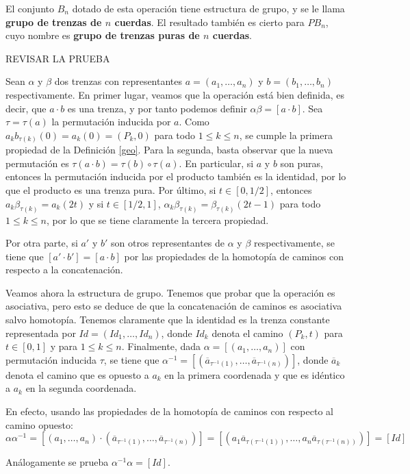 \documentclass[bibtex, anon]{TEMat-article}
\begin{document}
\begin{proposicion}
	El conjunto $B_n$ dotado de esta operación tiene estructura de grupo, y se le llama \textbf{grupo de trenzas de $n$ cuerdas}. El resultado también es cierto para $PB_n$, cuyo nombre es \textbf{grupo de trenzas puras de $n$ cuerdas}. 
\end{proposicion}
REVISAR LA PRUEBA
\begin{demostracion}
	Sean $\alpha$ y $\beta$ dos trenzas con representantes $a=(a_1,\dots, a_n)$ y $b=(b_1,\dots, b_n)$ respectivamente. En primer lugar, veamos que la operación está bien definida, es decir, que $a\cdot b$ es una trenza, y por tanto podemos definir $\alpha\beta=[a\cdot b]$. Sea $\tau=\tau(a)$ la permutación inducida por $a$. Como $a_kb_{\tau(k)}(0)=a_k(0)=(P_k,0)$ para todo $1\leq k\leq n$, se cumple la primera propiedad de la Definición \ref{geo}. Para la segunda, basta observar que la nueva permutación es $\tau(a\cdot b)=\tau(b)\circ \tau(a)$. En particular, si $a$ y $b$ son puras, entonces la permutación inducida por el producto también es la identidad, por lo que el producto es una trenza pura. Por último, si $t\in[0,1/2]$, entonces $a_k\beta_{\tau(k)}=a_k(2t)$ y si $t\in [1/2,1]$, $\alpha_k\beta_{\tau(k)}=\beta_{\tau(k)}(2t-1)$ para todo $1\leq k\leq n$, por lo que se tiene claramente la tercera propiedad. 
	
	Por otra parte, si $a'$ y $b'$ son otros representantes de $\alpha$ y $\beta$ respectivamente, se tiene que $[a'\cdot b']=[a\cdot b]$ por las propiedades de la homotopía de caminos con respecto a la concatenación.
	
	Veamos ahora la estructura de grupo. Tenemos que probar que la operación es asociativa, pero esto se deduce de que la concatenación de caminos es asociativa salvo homotopía.
	Tenemos claramente que la identidad es la trenza constante representada por $Id=(Id_1,\dots, Id_n)$, donde $Id_k$ denota el camino $(P_k, t)$ para $t\in[0,1]$ y para $1\leq k\leq n$.
	Finalmente, dada $\alpha=[(a_1,\dots, a_n)]$ con permutación inducida $\tau$, se tiene que $\alpha^{-1}=[(\overline{a}_{\tau^{-1}(1)},\dots, \overline{a}_{\tau^{-1}(n)})]$, donde $\overline{a}_k$ denota el camino que es opuesto a $a_k$ en la primera coordenada y que es idéntico a $a_k$ en la segunda coordenada. 
	
	En efecto, usando las propiedades de la homotopía de caminos con respecto al camino opuesto:
	\[
	\alpha\alpha^{-1}=[(a_1,\dots, a_n)\cdot (\overline{a}_{\tau^{-1}(1)},\dots, \overline{a}_{\tau^{-1}(n)})]=[(a_1\overline{a}_{\tau(\tau^{-1}(1))},\dots, a_n\overline{a}_{\tau(\tau^{-1}(n))})]=[Id]
	\]
	
	Análogamente se prueba $\alpha^{-1}\alpha=[Id]$. 
	
\end{demostracion}
\end{document}

